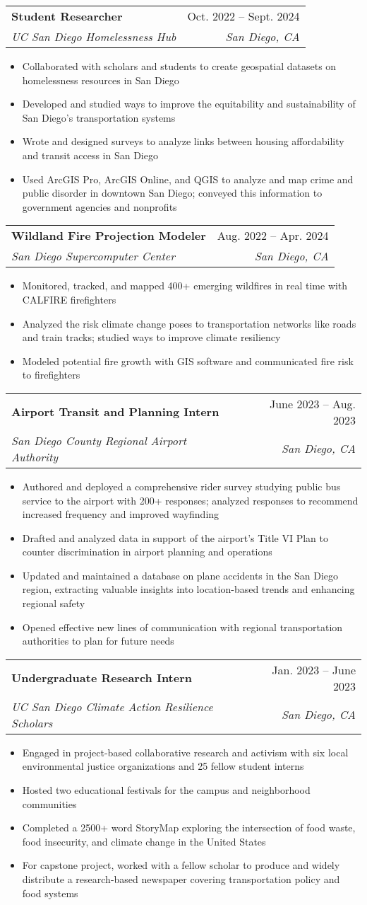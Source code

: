 \documentclass[letterpaper,11pt]{article}
\makeatletter
\newcommand{\resumeItem}[1]{
  \item\small{
    {#1 \vspace{-2pt}}
  }
}
\newcommand{\resumeSubheading}[4]{
  \vspace{-2pt}\item
    \begin{tabular*}{0.97\textwidth}[t]{l@{\extracolsep{\fill}}r}
      \textbf{#1} & #2 \\
      \textit{\small#3} & \textit{\small #4} \\
    \end{tabular*}\vspace{-7pt}
}
\newcommand{\resumeItemListStart}{\begin{itemize}}
\newcommand{\resumeItemListEnd}{\end{itemize}\vspace{-5pt}}
\makeatother
\begin{document}
    \resumeSubheading
      {Student Researcher}{Oct. 2022 -- Sept. 2024}
      {UC San Diego Homelessness Hub}{San Diego, CA}
      \resumeItemListStart
        \resumeItem{Collaborated with scholars and students to create geospatial datasets on homelessness resources in San Diego}
        \resumeItem{Developed and studied ways to improve the equitability and sustainability of San Diego’s transportation systems}
        \resumeItem{Wrote and designed surveys to analyze links between housing affordability and transit access in San Diego}
        \resumeItem{Used ArcGIS Pro, ArcGIS Online, and QGIS to analyze and map crime and public disorder in downtown San Diego; conveyed          this information to government agencies and nonprofits}
      \resumeItemListEnd

    \resumeSubheading
      {Wildland Fire Projection Modeler}{Aug. 2022 -- Apr. 2024}
      {San Diego Supercomputer Center}{San Diego, CA}
      \resumeItemListStart
        \resumeItem{Monitored, tracked, and mapped 400+ emerging wildfires in real time with CALFIRE firefighters}
        \resumeItem{Analyzed the risk climate change poses to transportation networks like roads and train tracks; studied ways to improve climate resiliency}
        \resumeItem{Modeled potential fire growth with GIS software and communicated fire risk to firefighters}
    \resumeItemListEnd

    \resumeSubheading
      {Airport Transit and Planning Intern}{June 2023 -- Aug. 2023}
      {San Diego County Regional Airport Authority}{San Diego, CA}
      \resumeItemListStart
        \resumeItem{Authored and deployed a comprehensive rider survey studying public bus service to the airport with 200+ responses; analyzed responses to recommend increased frequency and improved wayfinding}
        \resumeItem{Drafted and analyzed data in support of the airport’s Title VI Plan to counter discrimination in airport planning and operations}
        \resumeItem{Updated and maintained a database on plane accidents in the San Diego region, extracting valuable insights into location-based trends and enhancing regional safety}
        \resumeItem{Opened effective new lines of communication with regional transportation authorities to plan for future needs}
      \resumeItemListEnd

    \resumeSubheading
      {Undergraduate Research Intern}{Jan. 2023 -- June 2023}
      {UC San Diego Climate Action Resilience Scholars}{San Diego, CA}
      \resumeItemListStart
        \resumeItem{Engaged in project-based collaborative research and activism with six local environmental justice organizations and 25 fellow student interns}
        \resumeItem{Hosted two educational festivals for the campus and neighborhood communities}
        \resumeItem{Completed a 2500+ word StoryMap exploring the intersection of food waste, food insecurity, and climate change in the United States}
        \resumeItem{For capstone project, worked with a fellow scholar to produce and widely distribute a research-based newspaper covering transportation policy and food systems}
      \resumeItemListEnd
\end{document}
